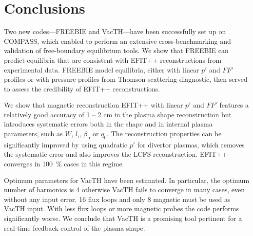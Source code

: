 
\section{Conclusions} %
\label{sec:conclusions}

Two new codes---FREEBIE and VacTH---have been successfully set up on COMPASS, which enabled to perform an extensive cross-benchmarking and validation of free-boundary equilibrium tools. We show that FREEBIE can predict equilibria that are consistent with EFIT++ reconstructions from experimental data. FREEBIE model equilibria, either with linear $p'$ and $FF'$ profiles or with pressure profiles from Thomson scattering diagnostic, then served to assess the credibility of EFIT++ reconstructions. 

We show that magnetic reconstruction EFIT++ with linear $p'$ and $FF'$ features a relatively good accuracy of 1 -- 2 cm in the plasma shape reconstruction but introduces systematic errors both in the shape and in internal plasma parameters, such as $W$, $l_{\mathrm i}$, $\beta_{\mathrm p}$ or $q_0$. The reconstruction properties can be significantly improved by using quadratic $p'$ for divertor plasmas, which removes the systematic error and also improves the LCFS reconstruction. EFIT++ converges in 100~\% cases in this regime.

Optimum parameters for VacTH have been estimated. In particular, the optimum number of harmonics is 4 otherwise VacTH fails to converge in many cases, even without any input error. 16 flux loops and only 8 magnetic must be used as VacTH input. With less flux loops or more magnetic probes the code performs significantly worse. We conclude that VacTH is a promising tool pertinent for a real-time feedback control of the plasma shape.

